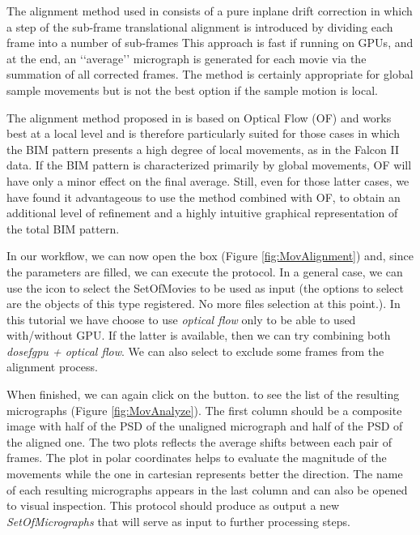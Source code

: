 \documentclass[12pt]{article} %
\begin{document}
The alignment method used in \citep{Li2013} consists of a pure inplane drift correction in 
which a step of the sub-frame translational alignment is introduced by dividing each frame into a number of
sub-frames This approach is fast if running on GPUs, and at the end, an ‘‘average’’ micrograph is generated for each
movie via the summation of all corrected frames. The method is certainly appropriate for global sample movements
but is not the best option if the sample motion is local. 

The alignment method proposed in \citep{Abrishami2015} is based on Optical Flow (OF) and works best at a local level 
and is therefore particularly suited for those cases in which the BIM pattern presents a high degree of local movements, as in the Falcon II data.
If the BIM pattern is characterized primarily by global movements, OF will have only a minor effect on the final average. 
Still, even for those latter cases, we have found it advantageous to use the \citep{Li2013} method combined with OF,
to obtain an additional level of refinement and a highly intuitive graphical representation of the total BIM pattern.

In our workflow, we can now open the  box (Figure \ref{fig:MovAlignment}) and, since the parameters are filled,
we can execute the protocol. In a general case, we can use the  icon to select the SetOfMovies to be used as input (the options
to select are the objects of this type registered. No more files selection at this point.). In this tutorial we have choose to use \emph{optical flow}
only to be able to used with/without GPU. If the latter is available, then we can try combining both \emph{dosefgpu + optical flow}.
We can also select to exclude some frames from the alignment process.

When finished, we can again click on the  button. to see the list of the resulting micrographs (Figure \ref{fig:MovAnalyze}).
The first column should be a composite image with half of the PSD of the unaligned micrograph and half of the PSD of the aligned one.
The two plots reflects the average shifts between each pair of frames. The plot in polar coordinates helps to evaluate the magnitude of the movements
while the one in cartesian represents better the direction. The name of each resulting micrographs appears in the last column and can also be opened to 
visual inspection. This protocol should produce as output a new \emph{SetOfMicrographs} that will serve as input to further processing steps.
\end{document}
